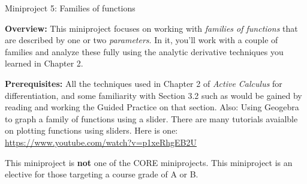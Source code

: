 \documentclass[11pt,letterpaper]{article}
\begin{document}
\begin{flushright}
	\begin{Large}
		Miniproject 5: Families of functions
	\end{Large}
\end{flushright}

\noindent
\textbf{Overview:} This miniproject focuses on working with \emph{families of functions} that are described by one or two \emph{parameters}. In it, you'll work with a couple of families and analyze these fully using the analytic derivative techniques you learned in Chapter 2. 

\medskip

\noindent
\textbf{Prerequisites:} All the techniques used in Chapter 2 of \emph{Active Calculus} for differentiation, and some familiarity with Section 3.2 such as would be gained by reading and working the Guided Practice on that section. Also: Using Geogebra to graph a family of functions using a slider. There are many tutorials avaialble on plotting functions using sliders. Here is one: \url{https://www.youtube.com/watch?v=p1xeRhgEB2U}

\medskip

\noindent
This miniproject is \textbf{not} one of the CORE miniprojects. This miniproject is an elective for those targeting a course grade of A or B. 
	

\hrulefill
\end{document}
